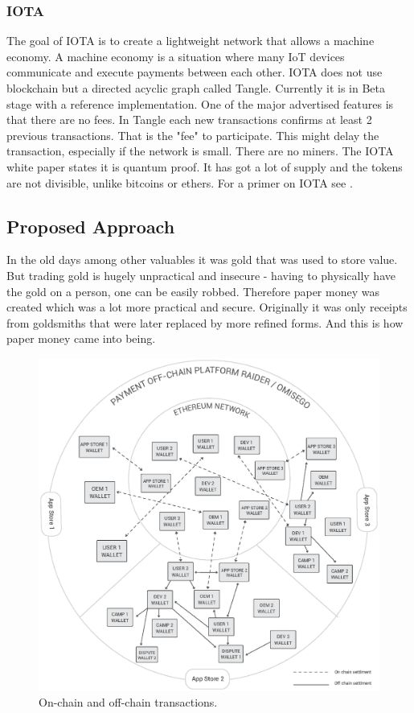 \subsubsection{IOTA}
The goal of IOTA is to create a lightweight network that allows a machine economy. A machine economy is a situation where many IoT devices communicate and execute payments between each other. IOTA does not use blockchain but a directed acyclic graph called Tangle. Currently it is in Beta stage with a reference implementation. One of the major advertised features is that there are no fees. In Tangle each new transactions confirms at least 2 previous transactions. That is the "fee" to participate. This might delay the transaction, especially if the network is small. There are no miners. The IOTA white paper states it is quantum proof. It has got a lot of supply and the tokens are not divisible, unlike bitcoins or ethers. For a primer on IOTA see \cite{IOTA}.

\subsection{Proposed Approach}
In the old days among other valuables it was gold that was used to store value. But trading gold is hugely unpractical and insecure - having to physically have the gold on a person, one can be easily robbed. Therefore paper money was created which was a lot more practical and secure. Originally it was only receipts from goldsmiths that were later replaced by more refined forms. And this is how paper money came into being.

\begin{figure}[!ht]
\centering
\includegraphics[width=\textwidth]{diagrams/offchain_wallets.eps}
\caption{On-chain and off-chain transactions.}
\label{fig:offchain}
\end{figure}



